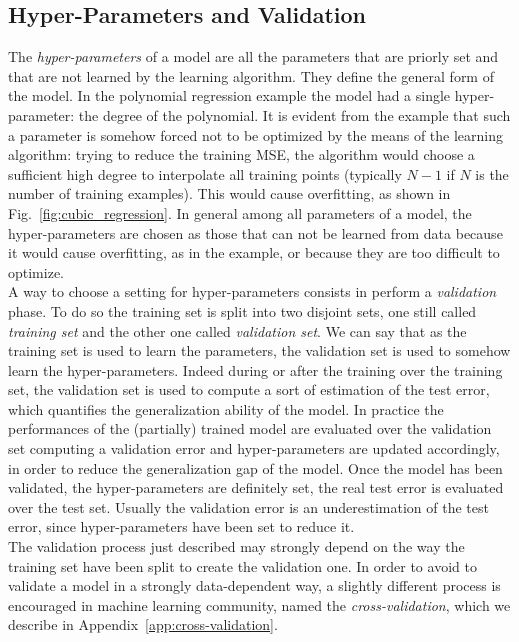 \subsection{Hyper-Parameters and Validation}
The \emph{hyper-parameters} of a model are all the parameters that are priorly set and that are not learned by the learning algorithm. They define the general form of the model. In the polynomial regression example the model had a single hyper-parameter: the degree of the polynomial. It is evident from the example that such a parameter is somehow forced not to be optimized by the means of the learning algorithm: trying to reduce the training MSE, the algorithm would choose a sufficient high degree to interpolate all training points (typically $N-1$ if $N$ is the number of training examples). This would cause overfitting, as shown in Fig.~\ref{fig:cubic_regression}. In general among all parameters of a model, the hyper-parameters are chosen as those that can not be learned from data because it would cause overfitting, as in the example, or because they are too difficult to optimize. \\
A way to choose a setting for hyper-parameters consists in perform a \emph{validation} phase. To do so the training set is split into two disjoint sets, one still called \emph{training set} and the other one called \emph{validation set}. We can say that as the training set is used to learn the parameters, the validation set is used to somehow learn the hyper-parameters. Indeed during or after the training over the training set, the validation set is used to compute a sort of estimation of the test error, which quantifies the generalization ability of the model. In practice the performances of the (partially) trained model are evaluated over the validation set computing a validation error and hyper-parameters are updated accordingly, in order to reduce the generalization gap of the model. Once the model has been validated, \ie the hyper-parameters are definitely set, the real test error is evaluated over the test set. Usually the validation error is an underestimation of the test error, since hyper-parameters have been set to reduce it. \\
The validation process just described may strongly depend on the way the training set have been split to create the validation one. In order to avoid to validate a model in a strongly data-dependent way, a slightly different process is encouraged in machine learning community, named the \emph{cross-validation}, which we describe in Appendix~\ref{app:cross-validation}.


